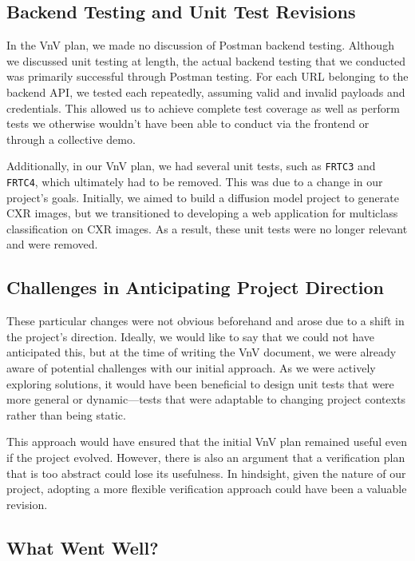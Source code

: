 \documentclass[12pt, titlepage]{article}
\begin{document}
\begin{enumerate}
  \subsection{Backend Testing and Unit Test Revisions}
  
  In the VnV plan, we made no discussion of Postman backend testing. Although we discussed unit testing at length, the actual backend testing that we conducted was primarily successful through Postman testing. For each URL belonging to the backend API, we tested each repeatedly, assuming valid and invalid payloads and credentials. This allowed us to achieve complete test coverage as well as perform tests we otherwise wouldn’t have been able to conduct via the frontend or through a collective demo.
  
  Additionally, in our VnV plan, we had several unit tests, such as \texttt{FRTC3} and \texttt{FRTC4}, which ultimately had to be removed. This was due to a change in our project’s goals. Initially, we aimed to build a diffusion model project to generate CXR images, but we transitioned to developing a web application for multiclass classification on CXR images. As a result, these unit tests were no longer relevant and were removed.
  
  \subsection{Challenges in Anticipating Project Direction}
  
  These particular changes were not obvious beforehand and arose due to a shift in the project’s direction. Ideally, we would like to say that we could not have anticipated this, but at the time of writing the VnV document, we were already aware of potential challenges with our initial approach. As we were actively exploring solutions, it would have been beneficial to design unit tests that were more general or dynamic—tests that were adaptable to changing project contexts rather than being static. 
  
  This approach would have ensured that the initial VnV plan remained useful even if the project evolved. However, there is also an argument that a verification plan that is too abstract could lose its usefulness. In hindsight, given the nature of our project, adopting a more flexible verification approach could have been a valuable revision.
  
  \subsection{What Went Well?}
  

\end{enumerate}
\end{document}
